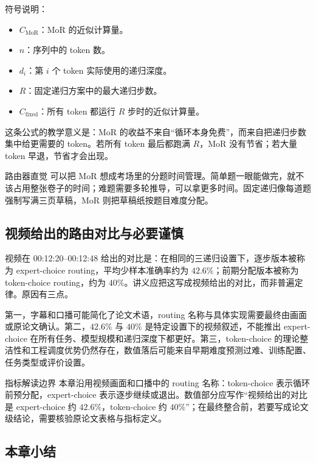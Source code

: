 ﻿\documentclass[a4paper]{article}
\begin{document}
符号说明：
\begin{itemize}
  \item \(C_{\mathrm{MoR}}\)：MoR 的近似计算量。
  \item \(n\)：序列中的 token 数。
  \item \(d_i\)：第 \(i\) 个 token 实际使用的递归深度。
  \item \(R\)：固定递归方案中的最大递归步数。
  \item \(C_{\mathrm{fixed}}\)：所有 token 都运行 \(R\) 步时的近似计算量。
\end{itemize}

这条公式的教学意义是：MoR 的收益不来自“循环本身免费”，而来自把递归步数集中给更需要的 token。若所有 token 最后都跑满 \(R\)，MoR 没有节省；若大量 token 早退，节省才会出现。

\begin{knowledgebox}{路由器直觉}
可以把 MoR 想成考场里的分题时间管理。简单题一眼能做完，就不该占用整张卷子的时间；难题需要多轮推导，可以拿更多时间。固定递归像每道题强制写满三页草稿，MoR 则把草稿纸按题目难度分配。
\end{knowledgebox}

\subsection{视频给出的路由对比与必要谨慎}

视频在 00:12:20--00:12:48 给出的对比是：在相同的三递归设置下，逐步版本被称为 expert-choice routing，平均少样本准确率约为 \(42.6\%\)；前期分配版本被称为 token-choice routing，约为 \(40\%\)。讲义应把这写成视频给出的对比，而非普遍定律。原因有三点。

第一，字幕和口播可能简化了论文术语，routing 名称与具体实现需要最终由画面或原论文确认。第二，\(42.6\%\) 与 \(40\%\) 是特定设置下的视频叙述，不能推出 expert-choice 在所有任务、模型规模和递归深度下都更好。第三，token-choice 的理论整洁性和工程调度优势仍然存在，数值落后可能来自早期难度预测过难、训练配置、任务类型或评价设置。

\begin{warningbox}{指标解读边界}
本章沿用视频画面和口播中的 routing 名称：token-choice 表示循环前预分配，expert-choice 表示逐步继续或退出。数值部分应写作“视频给出的对比是 expert-choice 约 \(42.6\%\)，token-choice 约 \(40\%\)”；在最终整合前，若要写成论文级结论，需要核验原论文表格与指标定义。
\end{warningbox}

\subsection{本章小结}
\end{document}
